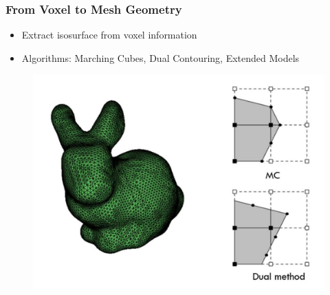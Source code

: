 \begin{frame}

	\frametitle{From Voxel to Mesh Geometry}
	\begin{minipage}{0.85\textwidth}
		\begin{itemize}
		\item Extract isosurface from voxel information
		\end{itemize}

		\begin{itemize}
		\item Algorithms: Marching Cubes, Dual Contouring, Extended Models
		\end{itemize}

		\begin{figure}
		\includegraphics[scale=0.4]{Pictures/bunny_MC.pdf}

		\end{figure}


\end{minipage}
\end{frame}
